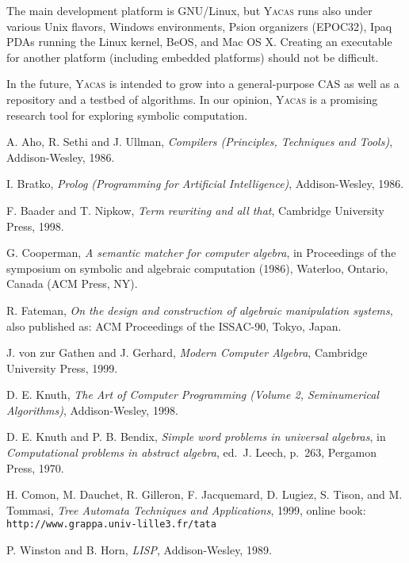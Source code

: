 \documentclass{llncs}
\begin{document}
The main development platform is GNU/Linux, but \textsc{Yacas} runs also
under various Unix flavors,  Windows environments, Psion organizers (EPOC32),
Ipaq PDAs running the Linux kernel, BeOS, and Mac OS X. Creating an
executable for another platform (including embedded platforms) should not be
difficult.

In the future, \textsc{Yacas} is intended to grow into a general-purpose CAS as well as a repository and a testbed of algorithms.
In our opinion, \textsc{Yacas} is a promising research tool for exploring symbolic computation.


\begin{thebibliography}{TATW99}

 A. Aho, R. Sethi and J. Ullman, \emph{Compilers (Principles, Techniques and Tools)}, Addison-Wesley, 1986.


 I. Bratko, \emph{Prolog (Programming for Artificial Intelligence)}, Addison-Wesley, 1986.


 F. Baader and T. Nipkow, \emph{Term rewriting and all that}, Cambridge University Press, 1998.


 G. Cooperman, \emph{A semantic matcher for computer algebra}, in Proceedings of the symposium on symbolic and algebraic computation (1986), Waterloo, Ontario, Canada (ACM Press, NY).


 R. Fateman, \emph{On the design and construction of algebraic manipulation systems}, also published as: ACM Proceedings of the ISSAC-90, Tokyo, Japan.


 J. von zur Gathen and J. Gerhard, \emph{Modern Computer Algebra}, Cambridge University Press, 1999.


 D. E. Knuth, \emph{The Art of Computer Programming (Volume 2, Seminumerical Algorithms)}, Addison-Wesley, 1998.

 D. E. Knuth and P. B. Bendix, \emph{Simple word problems in universal algebras}, in \emph{Computational problems in abstract algebra}, ed.~J. Leech, p.~263, Pergamon Press, 1970.




 H. Comon, M. Dauchet, R. Gilleron, F. Jacquemard, D. Lugiez, S. Tison, and M. Tommasi, \emph{Tree Automata Techniques and Applications}, 1999, online book: {\small \verb|http://www.grappa.univ-lille3.fr/tata|}




 P. Winston and B. Horn, \emph{LISP}, Addison-Wesley, 1989.


\end{thebibliography}
\end{document}

